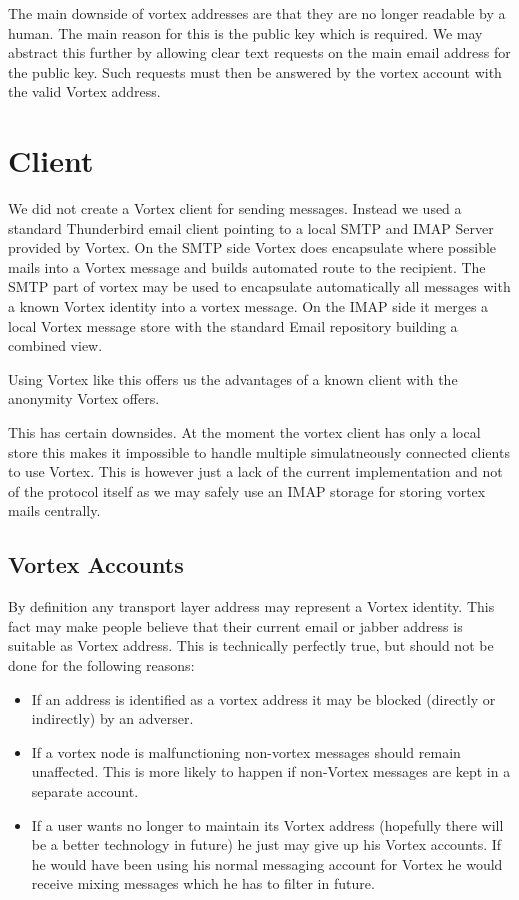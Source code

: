The main downside of vortex addresses are that they are no longer readable by a human. The main reason for this is the public key which is required. We may abstract this further by allowing clear text requests on the main email address for the public key. Such requests must then be answered by the vortex account with the valid Vortex address.

\section{Client}
We did not create a Vortex client for sending messages. Instead we used a standard Thunderbird email client pointing to a local SMTP and IMAP Server provided by Vortex. On the SMTP side Vortex does encapsulate where possible mails into a Vortex message and builds automated route to the recipient. The SMTP part of vortex may be used to encapsulate automatically all messages with a known Vortex identity into a vortex message. On the IMAP side it merges a local Vortex message store with the standard Email repository building a combined view.

Using Vortex like this offers us the advantages of a known client with the anonymity Vortex offers.

This has certain downsides. At the moment the vortex client has only a local store this makes it impossible to handle multiple simulatneously connected clients to use Vortex. This is however just a lack of the current implementation and not of the protocol itself as we may safely use an IMAP storage for storing vortex mails centrally.

\subsection{Vortex Accounts}
By definition any transport layer address may represent a Vortex identity. This fact may make people believe that their current email or jabber address is suitable as Vortex address. This is technically perfectly true, but should not be done for the following reasons:

\begin{itemize}
	\item If an address is identified as a vortex address it may be blocked (directly or indirectly) by an adverser.
	\item If a vortex node is malfunctioning non-vortex messages should remain unaffected. This is more likely to happen if non-Vortex messages are kept in a separate account.
	\item If a user wants no longer to maintain its Vortex address (hopefully there will be a better technology in future) he just may give up his Vortex accounts. If he would have been using his normal messaging account for Vortex he would receive mixing messages which he has to filter in future.
\end{itemize}

